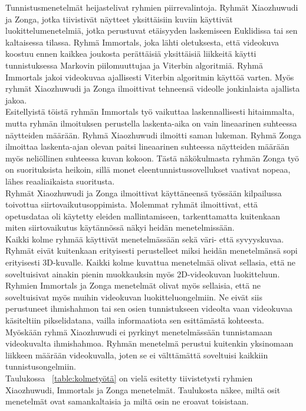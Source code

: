 Tunnistusmenetelmät heijastelivat ryhmien piirrevalintoja. Ryhmät Xiaozhuwudi ja Zonga, jotka tiivistivät näytteet 
yksittäisiin kuviin käyttivät luokittelumenetelmiä, jotka perustuvat etäisyyden laskemiseen 
Euklidissa tai sen kaltaisessa tilassa. Ryhmä Immortals, joka lähti oletuksesta, että videokuva koostuu ennen kaikkea joukosta perättäisiä 
yksittäisiä liikkeitä käytti tunnistuksessa Markovin piilomuuttujaa ja Viterbin algoritmiä. Ryhmä Immortals jakoi videokuvaa 
ajallisesti Viterbin algoritmin käyttöä varten. Myös ryhmät Xiaozhuwudi ja Zonga ilmoittivat tehneensä videolle jonkinlaista ajallista jakoa. \\

Esitellyistä töistä ryhmän Immortals työ vaikuttaa laskennallisesti hitaimmalta, mutta ryhmän ilmoituksen perustella laskenta-aika on vain lineaarinen suhteessa 
näytteiden määrään. Ryhmä Xiaozhuwudi ilmoitti saman lukeman. Ryhmä Zonga ilmoittaa laskenta-ajan olevan paitsi lineaarinen suhteessa näytteiden määrään myös
neliöllinen suhteessa kuvan kokoon. Tästä näkökulmasta ryhmän Zonga työ on suorituksista heikoin, sillä monet eleentunnistussovellukset vaativat 
nopeaa, lähes reaaliaikaista suoritusta. \\

Ryhmät Xiaozhuwudi ja Zonga ilmoittivat käyttäneensä työssään kilpailussa toivottua siirtovaikutusoppimista. Molemmat ryhmät ilmoittivat,
että opetusdataa oli käytetty eleiden mallintamiseen, tarkenttamatta kuitenkaan miten siirtovaikutus käytännössä näkyi heidän menetelmissään.\\

Kaikki kolme ryhmää käyttivät menetelmässään sekä väri- että syvyyskuvaa. Ryhmät eivät kuitenkaan erityisesti perustelleet miksi heidän menetelmänsä sopi erityisesti
3D-kuvalle. Kaikki kolme kuvattua menetelmää olivat sellasia, että ne soveltuisivat ainakin pienin muokkauksin myös 2D-videokuvan luokitteluun.
Ryhmien Immortals ja Zonga menetelmät olivat myös sellaisia, että ne soveltuisivat myös muihin videokuvan luokitteluongelmiin.
Ne eivät siis perustuneet ihmishahmon tai sen osien tunnistukseen videolta vaan videokuvaa käsiteltiin pikselidatana, vailla informaatiota sen esittämästä
kohteesta. Myöskään ryhmä Xiaozhuwudi ei pyrkinyt menetelmässään tunnistamaan videokuvalta ihmishahmoa. Ryhmän menetelmä perustui kuitenkin 
yksinomaan liikkeen määrään videokuvalla, joten se ei välttämättä soveltuisi kaikkiin tunnistusongelmiin.\\

Taulukossa ~\ref{table:kolmetyötä} on vielä esitetty tiivistetysti ryhmien Xiaozhuwudi, Immortals ja Zonga menetelmät.
Taulukosta näkee, miltä osit menetelmät ovat samankaltaisia ja miltä osin ne eroavat toisistaan.\\

